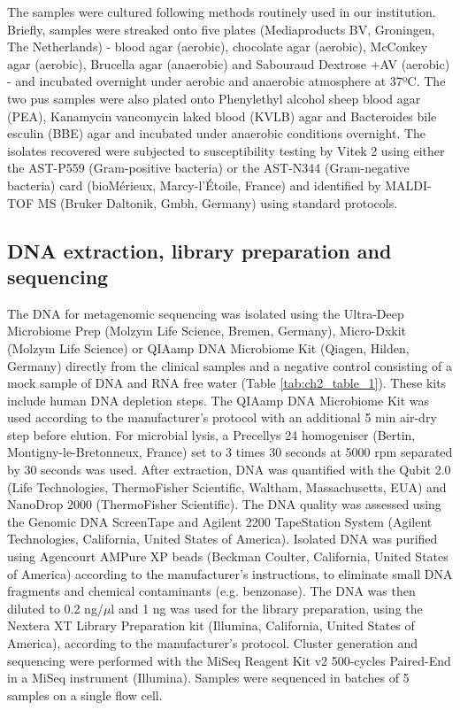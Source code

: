 The samples were cultured following methods routinely used in our institution. 
Briefly, samples were streaked onto five plates (Mediaproducts BV, Groningen, The Netherlands) - blood agar (aerobic), chocolate agar (aerobic), McConkey agar (aerobic), Brucella agar (anaerobic) and Sabouraud Dextrose +AV (aerobic) - and incubated overnight under aerobic and anaerobic atmosphere at 37ºC. 
The two pus samples were also plated onto Phenylethyl alcohol sheep blood agar (PEA), Kanamycin vancomycin laked blood (KVLB) agar and Bacteroides bile esculin (BBE) agar and incubated under anaerobic conditions overnight. 
The isolates recovered were subjected to susceptibility testing by Vitek 2 using either the AST-P559 (Gram-positive bacteria) or the AST-N344 (Gram-negative bacteria) card (bioMérieux, Marcy-l'Étoile, France) and identified by MALDI-TOF MS (Bruker Daltonik, Gmbh, Germany) using standard protocols. 

\subsection{DNA extraction, library preparation and sequencing} \label{ssec:sample_sequencing}

The DNA for metagenomic sequencing was isolated using the Ultra-Deep Microbiome Prep (Molzym Life Science, Bremen, Germany), Micro-Dx\texttrademark kit (Molzym Life Science) or QIAamp DNA Microbiome Kit (Qiagen, Hilden, Germany) directly from the clinical samples and a negative control consisting of a mock sample of DNA and RNA free water (Table \ref{tab:ch2_table_1}). 
These kits include human DNA depletion steps. 
The QIAamp DNA Microbiome Kit was used according to the manufacturer’s protocol with an additional 5 min air-dry step before elution. 
For microbial lysis, a Precellys 24 homogeniser (Bertin, Montigny-le-Bretonneux, France) set to 3 times 30 seconds at 5000 rpm separated by 30 seconds was used. 
After extraction, DNA was quantified with the Qubit 2.0 (Life Technologies, ThermoFisher Scientific, Waltham, Massachusetts, EUA) and NanoDrop 2000 (ThermoFisher Scientific). 
The DNA quality was assessed using the Genomic DNA ScreenTape and Agilent 2200 TapeStation System (Agilent Technologies, California, United States of America). 
Isolated DNA was purified using Agencourt AMPure XP beads (Beckman Coulter, California, United States of America) according to the manufacturer’s instructions, to eliminate small DNA fragments and chemical contaminants (e.g. benzonase). 
The DNA was then diluted to 0.2 ng/$\mu$l and 1 ng was used for the library preparation, using the Nextera XT Library Preparation kit (Illumina, California, United States of America), according to the manufacturer’s protocol. 
Cluster generation and sequencing were performed with the MiSeq Reagent Kit v2 500-cycles Paired-End in a MiSeq instrument (Illumina). 
Samples were sequenced in batches of 5 samples on a single flow cell.

